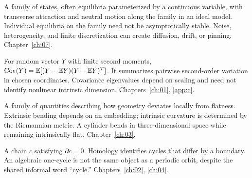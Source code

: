 \begin{description}[style=nextline]
\item[Continuous attractor.] A family of states, often equilibria parameterized by a continuous variable, with transverse attraction and neutral motion along the family in an ideal model. Individual equilibria on the family need not be asymptotically stable. Noise, heterogeneity, and finite discretization can create diffusion, drift, or pinning. Chapter~\ref{ch:07}.
\item[Covariance.] For random vector $Y$ with finite second moments, $\operatorname{Cov}(Y)=\mathbb{E}[(Y-\mathbb{E} Y)(Y-\mathbb{E} Y)^T]$. It summarizes pairwise second-order variation in chosen coordinates. Covariance eigenvalues depend on scaling and need not identify nonlinear intrinsic dimension. Chapters~\ref{ch:01}, \ref{app:c}.
\item[Curvature.] A family of quantities describing how geometry deviates locally from flatness. Extrinsic bending depends on an embedding; intrinsic curvature is determined by the Riemannian metric. A cylinder bends in three-dimensional space while remaining intrinsically flat. Chapter~\ref{ch:03}.
\item[Cycle.] A chain $c$ satisfying $\partial c=0$. Homology identifies cycles that differ by a boundary. An algebraic one-cycle is not the same object as a periodic orbit, despite the shared informal word ``cycle.'' Chapters~\ref{ch:02}, \ref{ch:04}.
\end{description}


